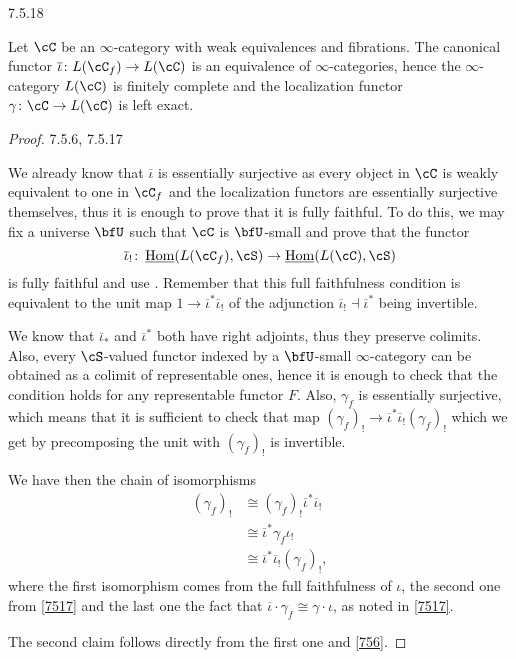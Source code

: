 \begin{prop}\label{7518}
  7.5.18

  Let $\cC$ be an $\infty$-category with weak equivalences and fibrations. The
  canonical functor $\overline{\iota}\colon L(\cC_f)\rightarrow L(\cC)$ is an
  equivalence of $\infty$-categories, hence the $\infty$-category $L(\cC)$ is
  finitely complete and the localization functor $\gamma\colon\cC\rightarrow
  L(\cC)$ is left exact.
\end{prop}
\begin{proof}
  7.5.6, 7.5.17

  We already know that $\overline{\iota}$ is essentially surjective as every
  object in $\cC$ is weakly equivalent to one in $\cC_f$ and the localization
  functors are essentially surjective themselves, thus it is enough to prove
  that it is fully faithful. To do this, we may fix a universe $\bfU$ such that
  $\cC$ is $\bfU$-small and prove that the functor
  \[\overline{\iota}_!\colon\home(L(\cC_f),\cS)\rightarrow\home(L(\cC),\cS)\]
  is fully faithful and use \cite[Prop.\ 6.1.15]{Cis19}. Remember that this full
  faithfulness condition is equivalent to the unit map
  $1\rightarrow\overline{\iota}^*\overline{\iota}_!$ of the adjunction
  $\overline{\iota}_!\dashv\overline{\iota}^*$ being invertible.

  We know that $\overline{\iota}_*$ and $\overline{\iota}^*$ both have right
  adjoints, thus they preserve colimits. Also, every $\cS$-valued functor
  indexed by a $\bfU$-small $\infty$-category can be obtained as a colimit of
  representable ones, hence it is enough to check that the condition holds for
  any representable functor $F$. Also, $\gamma_f$ is essentially surjective,
  which means that it is sufficient to check that map
  $(\gamma_f)_!\rightarrow\overline{\iota}^*\overline{\iota}_!(\gamma_f)_!$
  which we get by precomposing the unit with $(\gamma_f)_!$ is invertible.

  We have then the chain of isomorphisms
  \begin{align*}
    (\gamma_f)_! &\cong(\gamma_f)_!\overline{\iota}^*\overline{\iota}_! \\
                 &\cong\overline{\iota}^*\gamma_f\iota_! \\
                 &\cong\overline{\iota}^*\overline{\iota}_!(\gamma_f)_!,
  \end{align*}
  where the first isomorphism comes from the full faithfulness of $\iota$, the
  second one from \ref{7517} and the last one the fact that
  $\overline{\iota}\cdot\gamma_f\cong\gamma\cdot\iota$, as noted in \ref{7517}.

  The second claim follows directly from the first one and \ref{756}.
\end{proof}

